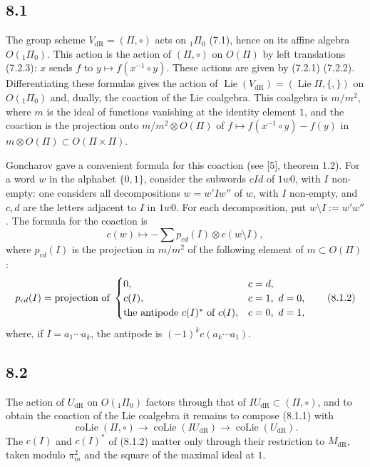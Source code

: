 \documentclass[10pt]{article}
\newcommand{\Lie}{\operatorname{Lie}}
\newcommand{\dR}{\mathrm{dR}}
\begin{document}
\subsection*{8.1}
The group scheme $V_{\dR}=(\Pi,\circ)$ acts on ${}_1\Pi_0$ (7.1), hence on its affine algebra $O({}_1\Pi_0)$. This action is the action of $(\Pi,\circ)$ on $O(\Pi)$ by left translations (7.2.3): $x$ sends $f$ to $y\mapsto f(x^{-1}\circ y)$. These actions are given by (7.2.1) (7.2.2). Differentiating these formulas gives the action of $\Lie(V_{\dR})=(\Lie\Pi,\{,\})$ on $O({}_1\Pi_0)$ and, dually, the coaction of the Lie coalgebra. This coalgebra is $m/m^2$, where $m$ is the ideal of functions vanishing at the identity element $1$, and the coaction is the projection onto $m/m^2\otimes O(\Pi)$ of $f\mapsto f(x^{-1}\circ y)-f(y)$ in $m\otimes O(\Pi)\subset O(\Pi\times\Pi)$.

Goncharov gave a convenient formula for this coaction (see [5], theorem 1.2). For a word $w$ in the alphabet $\{0,1\}$, consider the subwords $cId$ of $1w0$, with $I$ non-empty: one considers all decompositions $w=w'Iw''$ of $w$, with $I$ non-empty, and $c,d$ are the letters adjacent to $I$ in $1w0$. For each decomposition, put $w\setminus I:=w'w''$. The formula for the coaction is
\begin{equation}
c(w)\longmapsto -\sum p_{cd}(I)\otimes c(w\setminus I),
\tag{8.1.1}
\end{equation}
where $p_{cd}(I)$ is the projection in $m/m^2$ of the following element of $m\subset O(\Pi)$:
\begin{equation}
p_{cd}(I)=\hbox{projection of }\begin{cases}
0,& c=d,\\
c(I),& c=1,\ d=0,\\
\hbox{the antipode }c(I)^*\hbox{ of }c(I),& c=0,\ d=1,
\end{cases}
\tag{8.1.2}
\end{equation}
where, if $I=a_1\cdots a_k$, the antipode is $(-1)^kc(a_k\cdots a_1)$.

\subsection*{8.2}
The action of $U_{\dR}$ on $O({}_1\Pi_0)$ factors through that of $IU_{\dR}\subset(\Pi,\circ)$, and to obtain the coaction of the Lie coalgebra it remains to compose (8.1.1) with
\[
\operatorname{coLie}(\Pi,\circ)\longrightarrow\operatorname{coLie}(IU_{\dR})\longrightarrow\operatorname{coLie}(U_{\dR}).
\]
The $c(I)$ and $c(I)^*$ of (8.1.2) matter only through their restriction to $M_{\dR}$, taken modulo $\pi_m^2$ and the square of the maximal ideal at $1$.
\end{document}
